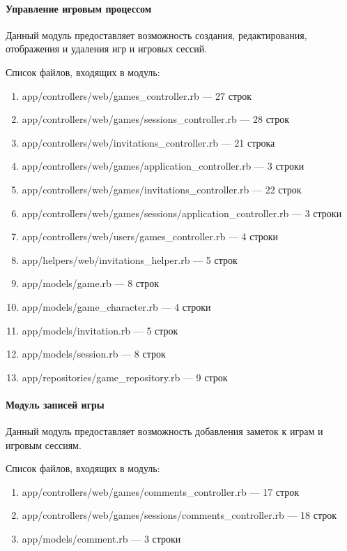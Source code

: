 \paragraph{Управление игровым процессом}

Данный модуль предоставляет возможность создания, редактирования, отображения и удаления игр и игровых сессий.

Список файлов, входящих в модуль:
\begin{enumerate}[label=\arabic*)]
\item app/controllers/web/games\_controller.rb --- 27 строк
\item app/controllers/web/games/sessions\_controller.rb --- 28 строк
\item app/controllers/web/invitations\_controller.rb --- 21 строка
\item app/controllers/web/games/application\_controller.rb --- 3 строки
\item app/controllers/web/games/invitations\_controller.rb --- 22 строк
\item app/controllers/web/games/sessions/application\_controller.rb --- 3 строки
\item app/controllers/web/users/games\_controller.rb --- 4 строки
\item app/helpers/web/invitations\_helper.rb --- 5 строк
\item app/models/game.rb --- 8 строк
\item app/models/game\_character.rb --- 4 строки
\item app/models/invitation.rb --- 5 строк
\item app/models/session.rb --- 8 строк
\item app/repositories/game\_repository.rb --- 9 строк
\end{enumerate}


\paragraph{Модуль записей игры}

Данный модуль предоставляет возможность добавления заметок к играм и игровым сессиям.

Список файлов, входящих в модуль:
\begin{enumerate}[label=\arabic*)]
\item app/controllers/web/games/comments\_controller.rb --- 17 строк
\item app/controllers/web/games/sessions/comments\_controller.rb --- 18 строк
\item app/models/comment.rb --- 3 строки
\end{enumerate}


